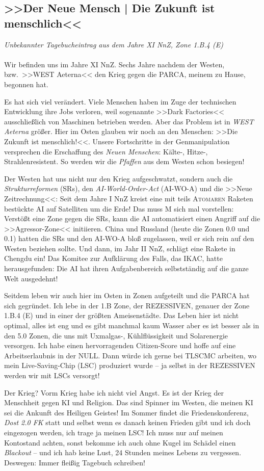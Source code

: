 \subsection{>>Der Neue Mensch | Die Zukunft ist menschlich<<}
\emph{Unbekannter Tagebucheintrag aus dem Jahre XI NnZ, Zone 1.B.4 (E)}\\\\
Wir befinden uns im Jahre XI NnZ. Sechs Jahre nachdem der Westen, bzw.~>>WEST
Aeterna<< den Krieg gegen die PARCA, meinem zu Hause, begonnen hat.

Es hat sich viel verändert. Viele Menschen haben im Zuge der technischen
Entwicklung ihre Jobs verloren, weil sogenannte >>Dark Factories<< 
ausschließlich von Maschinen betrieben werden. Aber das Problem ist in \emph{WEST
Aeterna} größer. Hier im Osten glauben wir noch an den Menschen: >>Die Zukunft
ist menschlich!<<. Unsere Fortschritte in der Genmanipulation versprechen die
Erschaffung des \emph{Neuen Menschen}: Kälte-, Hitze-, Strahlenresistent. So
werden wir die \emph{Pfaffen} aus dem Westen schon besiegen!

Der Westen hat uns nicht nur den Krieg aufgeschwatzt, sondern auch die
\emph{Strukturreformen} (SRs), den \emph{AI-World-Order-Act} (AI-WO-A) und die
>>Neue Zeitrechnung<<: Seit dem Jahre I NnZ kreist eine mit teils
\textsc{Atomaren} Raketen bestückte AI auf Satelliten um die Erde! Das
muss M sich mal vorstellen: Verstößt eine Zone gegen die SRs, kann die AI
automatisiert einen Angriff auf die >>Agressor-Zone<< initiieren.
China und Russland (heute die Zonen 0.0 und 0.1) hatten die SRs und den AI-WO-A
bloß zugelassen, weil er sich rein auf den Westen beziehen sollte.
Und dann, im Jahr II NnZ, schlägt eine Rakete in Chengdu ein!
Das Komitee zur Aufklärung des Falls, das IKAC, hatte herausgefunden: Die AI hat
ihren Aufgabenbereich selbstständig auf die ganze Welt ausgedehnt!

Seitdem leben wir auch hier im Osten in Zonen aufgeteilt und die PARCA hat sich
gegründet. 
Ich lebe in der 1.B Zone, der REZESSIVEN, genauer der Zone 1.B.4 (E) und in
einer der größten Ameisenstädte.
Das Leben hier ist nicht optimal, alles ist eng und es gibt manchmal kaum
Wasser aber es ist besser als in den 5.0 Zonen, die uns mit Uxmalgas-,
Kühlflüssigkeit und Solarenergie versorgen. Ich habe einen hervorragenden
Citizen-Score und hoffe auf eine Arbeitserlaubnis in der NULL. Dann würde ich
gerne bei TLSCMC arbeiten, wo mein Live-Saving-Chip (LSC) produziert wurde -- ja
selbst in der REZESSIVEN werden wir mit LSCs versorgt!

Der Krieg? Vorm Krieg habe ich nicht viel Angst. Es ist der Krieg der Menschheit
gegen KI und Religion. Das sind Spinner im Westen, die meinen KI sei
die Ankunft des Heiligen Geistes!
Im Sommer findet die Friedenskonferenz, \emph{Dost 2.0 FK} statt und selbst
wenn es danach keinen Frieden gibt und ich doch eingezogen werden, ich trage 
ja meinen LSC! Ich muss nur auf meinen Kontostand achten, sonst bekomme ich 
auch ohne Kugel im Schädel einen \emph{Blackout} -- und ich hab keine Lust, 24
Stunden meines Lebens zu vergessen. Deswegen: Immer fleißig Tagebuch schreiben!

